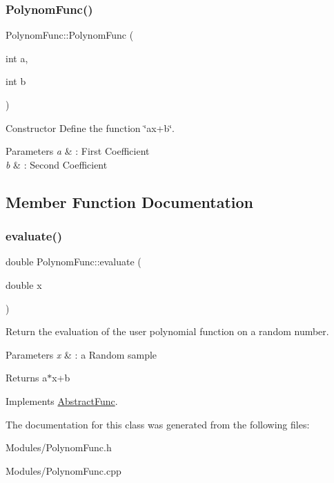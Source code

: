 \subsubsection{\texorpdfstring{Polynom\+Func()}{PolynomFunc()}}
{\footnotesize\ttfamily Polynom\+Func\+::\+Polynom\+Func (\begin{DoxyParamCaption}\item[{int}]{a,  }\item[{int}]{b }\end{DoxyParamCaption})\hspace{0.3cm}{\ttfamily [inline]}}



Constructor Define the function \char`\"{}ax+b\char`\"{}. 


\begin{DoxyParams}{Parameters}
{\em a} & \+: First Coefficient \\
\hline
{\em b} & \+: Second Coefficient \\
\hline
\end{DoxyParams}


\subsection{Member Function Documentation}
\mbox{\label{classPolynomFunc_a9908fc0cf0686123a98d3186d481fa6f}} 
\subsubsection{\texorpdfstring{evaluate()}{evaluate()}}
{\footnotesize\ttfamily double Polynom\+Func\+::evaluate (\begin{DoxyParamCaption}\item[{double}]{x }\end{DoxyParamCaption})\hspace{0.3cm}{\ttfamily [virtual]}}



Return the evaluation of the user polynomial function on a random number. 


\begin{DoxyParams}{Parameters}
{\em x} & \+: a Random sample \\
\hline
\end{DoxyParams}
\begin{DoxyReturn}{Returns}
a$\ast$x+b 
\end{DoxyReturn}


Implements \hyperlink{classAbstractFunc_ac98be1daa5131b9fddcfdba0a2c34871}{Abstract\+Func}.



The documentation for this class was generated from the following files\+:\begin{DoxyCompactItemize}
\item 
Modules/Polynom\+Func.\+h\item 
Modules/Polynom\+Func.\+cpp\end{DoxyCompactItemize}
